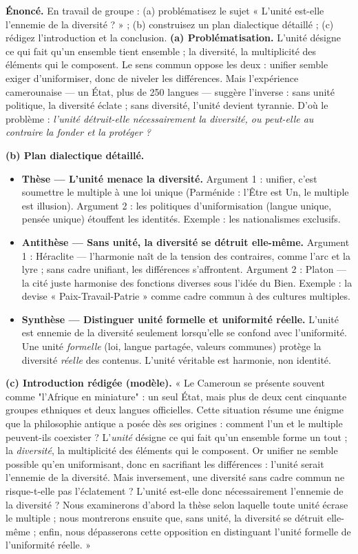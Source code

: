 \documentclass[11pt]{article}
\begin{document}
\begin{exoresolu}
\textbf{Énoncé.} En travail de groupe : (a) problématisez le sujet « L'unité est-elle l'ennemie de la diversité ? » ; (b) construisez un plan dialectique détaillé ; (c) rédigez l'introduction et la conclusion.
\tcblower
\textbf{(a) Problématisation.} L'unité désigne ce qui fait qu'un ensemble tient ensemble ; la diversité, la multiplicité des éléments qui le composent. Le sens commun oppose les deux : unifier semble exiger d'uniformiser, donc de niveler les différences. Mais l'expérience camerounaise — un État, plus de 250 langues — suggère l'inverse : sans unité politique, la diversité éclate ; sans diversité, l'unité devient tyrannie. D'où le problème : \emph{l'unité détruit-elle nécessairement la diversité, ou peut-elle au contraire la fonder et la protéger ?}

\textbf{(b) Plan dialectique détaillé.}
\begin{itemize}
\item \textbf{Thèse — L'unité menace la diversité.} Argument 1 : unifier, c'est soumettre le multiple à une loi unique (Parménide : l'Être est Un, le multiple est illusion). Argument 2 : les politiques d'uniformisation (langue unique, pensée unique) étouffent les identités. Exemple : les nationalismes exclusifs.
\item \textbf{Antithèse — Sans unité, la diversité se détruit elle-même.} Argument 1 : Héraclite — l'harmonie naît de la tension des contraires, comme l'arc et la lyre ; sans cadre unifiant, les différences s'affrontent. Argument 2 : Platon — la cité juste harmonise des fonctions diverses sous l'idée du Bien. Exemple : la devise « Paix-Travail-Patrie » comme cadre commun à des cultures multiples.
\item \textbf{Synthèse — Distinguer unité formelle et uniformité réelle.} L'unité est ennemie de la diversité seulement lorsqu'elle se confond avec l'uniformité. Une unité \emph{formelle} (loi, langue partagée, valeurs communes) protège la diversité \emph{réelle} des contenus. L'unité véritable est harmonie, non identité.
\end{itemize}

\textbf{(c) Introduction rédigée (modèle).} « Le Cameroun se présente souvent comme "l'Afrique en miniature" : un seul État, mais plus de deux cent cinquante groupes ethniques et deux langues officielles. Cette situation résume une énigme que la philosophie antique a posée dès ses origines : comment l'un et le multiple peuvent-ils coexister ? L'\emph{unité} désigne ce qui fait qu'un ensemble forme un tout ; la \emph{diversité}, la multiplicité des éléments qui le composent. Or unifier ne semble possible qu'en uniformisant, donc en sacrifiant les différences : l'unité serait l'ennemie de la diversité. Mais inversement, une diversité sans cadre commun ne risque-t-elle pas l'éclatement ? L'unité est-elle donc nécessairement l'ennemie de la diversité ? Nous examinerons d'abord la thèse selon laquelle toute unité écrase le multiple ; nous montrerons ensuite que, sans unité, la diversité se détruit elle-même ; enfin, nous dépasserons cette opposition en distinguant l'unité formelle de l'uniformité réelle. »


\end{exoresolu}
\end{document}
